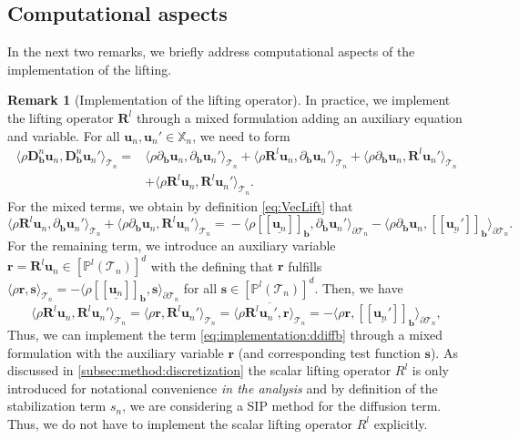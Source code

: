\documentclass{m2an}
\newcommand{\bflow}{\mathbf{b}}
\renewcommand{\u}{\mathbf{u}}
\newcommand{\calT}{\mathcal{T}}
\newcommand{\Xn}{\mathbb{X}_n}
\newcommand{\bD}{\mathbf{D}}
\newcommand{\bRl}{\mathbf{R}^{\!l}}
\newcommand{\hdgjump}[1]{[\![\underline{#1} ]\!]}
\newcommand{\Tn}{\calT_n}
\newcommand{\spl}{\langle}
\newcommand{\spr}{\rangle}
\newcommand{\diffb}{\partial_{\bflow}}
\newcommand{\ddiffb}{\bD_{\bflow}^n}
\theoremstyle{plain}
\theoremstyle{definition}
\newtheorem{remark}[theorem]{Remark}
\begin{document}
\subsection{Computational aspects}\label{subsec:numex:compasp}
In the next two remarks, we briefly address computational aspects of the implementation of the lifting.
\begin{remark}[Implementation of the lifting operator]\label{rem:numex:liftingImpl}
   In practice, we implement the lifting operator $\bRl$ through a mixed formulation adding an auxiliary equation and variable. 
   For all $\u_n, \u_n' \in \Xn$, we need to form
   \begin{equation}\label{eq:implementation:ddiffb}
      \begin{aligned}
         \spl \rho \ddiffb \u_n, \ddiffb \u_n' \spr_{\Tn} = &\spl \rho \diffb \u_n, \diffb \u_n' \spr_{\Tn} + \spl \rho \bRl \u_n, \diffb \u_n' \spr_{\Tn} + \spl \rho \diffb \u_n, \bRl \u_n' \spr_{\Tn} \\ 
         &+ \spl \rho \bRl \u_n, \bRl \u_n' \spr_{\Tn}.
      \end{aligned}
   \end{equation}
   For the mixed terms, we obtain by definition \eqref{eq:VecLift} that
   \begin{equation}
      \spl \rho \bRl \u_n, \diffb \u_n' \spr_{\Tn} \!+\! \spl \rho\diffb \u_n, \bRl \u_n' \spr_{\Tn} \!=\! - \spl\rho \hdgjump{\u_n}_{\bflow}, \diffb \u_n' \spr_{\partial \Tn} \!- \spl \rho \diffb \u_n, \hdgjump{\u_n'}_{\bflow} \spr_{\partial \Tn}\!.\! 
   \end{equation}
   For the remaining term, we introduce an auxiliary variable $\bm{r} = \bRl \u_n \in [\mathbb{P}^l(\Tn)]^d$ with the defining that $\bm{r}$ fulfills $\spl \rho \bm{r}, \bm{s} \spr_{\Tn} = - \spl \rho \hdgjump{\u_n}_{\bflow}, \bm{s} \spr_{\partial \Tn}$ for all $\bm{s} \in [\mathbb{P}^l(\Tn)]^d$. Then, we have   
   \begin{equation}
      \spl \rho \bRl \u_n, \bRl \u_n' \spr_{\Tn} = \spl \rho \bm{r}, \bRl \u_n' \spr_{\Tn} = \overline{\spl \rho \bRl \u_n', \bm{r} \spr_{\Tn}} = - \spl \rho \bm{r},  \hdgjump{\u_n'}_{\bflow} \spr_{\partial \Tn}, 
   \end{equation} 
   Thus, we can implement the term \eqref{eq:implementation:ddiffb} through a mixed formulation with the auxiliary variable $\bm{r}$ (and corresponding test function $\bm{s}$).
   As discussed in \cref{subsec:method:discretization} the scalar lifting operator $R^l$ is only introduced for notational convenience \emph{in the analysis} and by definition of the stabilization term $s_n$, we are considering a SIP method for the diffusion term. Thus, we do not have to implement the scalar lifting operator $R^l$ explicitly.
\end{remark}
\end{document}
